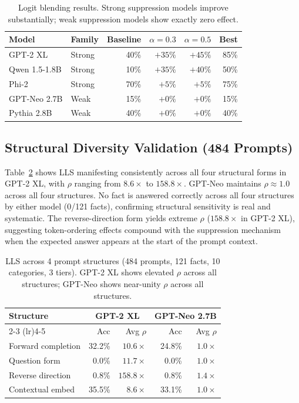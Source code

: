 \documentclass{article}
\begin{document}
\begin{table}[htbp]
\caption{Logit blending results. Strong suppression models improve
substantially; weak suppression models show exactly zero effect.}
\label{tab:intervention}
\centering\small
\begin{tabular}{llrrrr}
\toprule
\textbf{Model} & \textbf{Family} & \textbf{Baseline}
  & $\alpha{=}0.3$ & $\alpha{=}0.5$ & \textbf{Best} \\
\midrule
GPT-2 XL      & Strong & 40\% & $+35\%$ & $+45\%$ & 85\% \\
Qwen 1.5-1.8B & Strong & 10\% & $+35\%$ & $+40\%$ & 50\% \\
Phi-2         & Strong & 70\% & $+5\%$  & $+5\%$  & 75\% \\
GPT-Neo 2.7B  & Weak   & 15\% & $+0\%$  & $+0\%$  & 15\% \\
Pythia 2.8B   & Weak   & 40\% & $+0\%$  & $+0\%$  & 40\% \\
\bottomrule
\end{tabular}
\end{table}

\subsection{Structural Diversity Validation (484 Prompts)}

Table~\ref{tab:structures} shows LLS manifesting consistently across all
four structural forms in GPT-2 XL, with $\rho$ ranging from $8.6\times$
to $158.8\times$. GPT-Neo maintains $\rho \approx 1.0$ across all four
structures. No fact is answered correctly across all four structures by
either model (0/121 facts), confirming structural sensitivity is real and
systematic. The reverse-direction form yields extreme $\rho$ ($158.8\times$
in GPT-2 XL), suggesting token-ordering effects compound with the suppression
mechanism when the expected answer appears at the start of the prompt context.

\begin{table}[htbp]
\caption{LLS across 4 prompt structures (484 prompts, 121 facts, 10
categories, 3 tiers). GPT-2 XL shows elevated $\rho$ across all
structures; GPT-Neo shows near-unity $\rho$ across all structures.}
\label{tab:structures}
\centering\small
\begin{tabular}{lrrrr}
\toprule
\textbf{Structure}
  & \multicolumn{2}{c}{\textbf{GPT-2 XL}}
  & \multicolumn{2}{c}{\textbf{GPT-Neo 2.7B}} \\ \cmidrule(lr){2-3} \cmidrule(lr){4-5}
  & Acc & Avg $\rho$ & Acc & Avg $\rho$ \\
\midrule
Forward completion & 32.2\% & $10.6\times$ & 24.8\% & $1.0\times$ \\
Question form      &  0.0\% & $11.7\times$ &  0.0\% & $1.0\times$ \\
Reverse direction  &  0.8\% & $158.8\times$ & 0.8\% & $1.4\times$ \\
Contextual embed   & 35.5\% &  $8.6\times$ & 33.1\% & $1.0\times$ \\
\bottomrule
\end{tabular}
\end{table}
\end{document}
